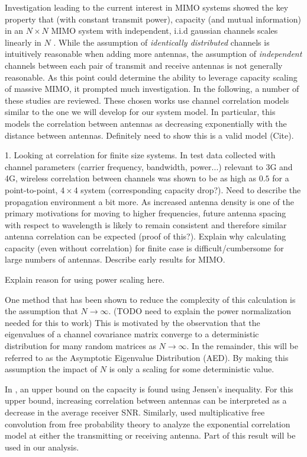 \par
Investigation leading to the current interest in MIMO systems showed the key property that (with constant transmit power), capacity (and mutual information) in an $N \times N$ MIMO system with independent, i.i.d gaussian channels scales linearly in $N$ \cite{foschini1998limits}. While the assumption of \emph{identically distributed} channels is intuitively reasonable when adding more antennas, the assumption of \emph{independent} channels between each pair of transmit and receive antennas is not generally reasonable. As this point could determine the ability to leverage capacity scaling of massive MIMO, it prompted much investigation. In the following, a number of these studies are reviewed. These chosen works use channel correlation models similar to the one we will develop for our system model. In particular, this models the correlation between antennas as decreasing  exponentially with the distance between antennas. Definitely need to show this is a valid model (Cite).
\par
1. Looking at correlation for finite size systems.
In test data collected with channel parameters (carrier frequency, bandwidth, power...) relevant to 3G and 4G, wireless correlation between channels was shown to be as high as $0.5$ for a point-to-point, $4 \times 4$ system \cite{martin2000multiple} (corresponding capacity drop?). Need to describe the propagation environment a bit more. 
As increased antenna density is one of the primary motivations for moving to higher frequencies, future antenna spacing with respect to wavelength is likely to remain consistent and therefore similar antenna correlation can be expected (proof of this?).
Explain why calculating capacity (even without correlation) for finite case is difficult/cumbersome for large numbers of antennas. Describe early results for MIMO.
\par
Explain reason for using power scaling here.

\par
One method that has been shown to reduce the complexity of this calculation is the assumption that $N \rightarrow \infty$. 
(TODO need to explain the power normalization needed for this to work)
This is motivated by the observation that the eigenvalues of a channel covariance matrix converge to a deterministic distribution for many random 
matrices as  $N \rightarrow \infty$. In the remainder, this will be referred to as the Asymptotic Eigenvalue Distribution (AED). 
By making this assumption the impact of $N$ is only a scaling for some deterministic value. 
\par
In \cite{loyka2001channel}, an upper bound on the capacity is found using Jensen's inequality. For this upper bound, increasing correlation between antennas can be interpreted as a decrease in the average receiver SNR. 
Similarly, \cite{skupch2005free} used multiplicative free convolution from free probability theory to analyze the exponential correlation model at either the transmitting or receiving antenna. Part of this result will be used in our analysis. 

